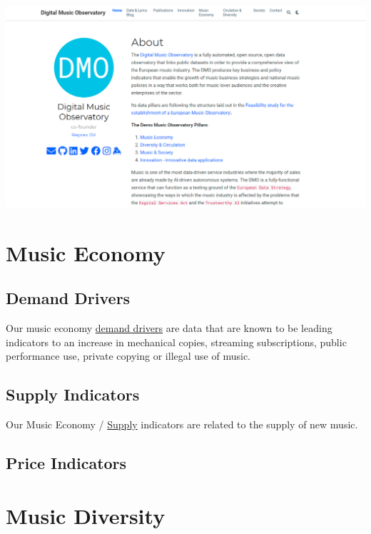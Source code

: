 \documentclass[
  a4paper,
  openany, a4paper, oneside]{book}
\begin{document}
\begin{center}\includegraphics[width=0.8\linewidth]{plots/dmo_opening_page} \end{center}

\hypertarget{music-economy}{%
\section{Music Economy}\label{music-economy}}

\hypertarget{demand-drivers}{%
\subsection{Demand Drivers}\label{demand-drivers}}

Our music economy \href{https://data.music.dataobservatory.eu/music-economy.html}{demand drivers} are data that are known to be leading indicators to an increase in mechanical copies, streaming subscriptions, public performance use, private copying or illegal use of music.

\hypertarget{supply-indicators}{%
\subsection{Supply Indicators}\label{supply-indicators}}

Our Music Economy / \href{https://data.music.dataobservatory.eu/music-economy.html\#supply}{Supply} indicators are related to the supply of new music.

\hypertarget{price-indicators}{%
\subsection{Price Indicators}\label{price-indicators}}

\hypertarget{music-diversity}{%
\section{Music Diversity}\label{music-diversity}}
\end{document}
